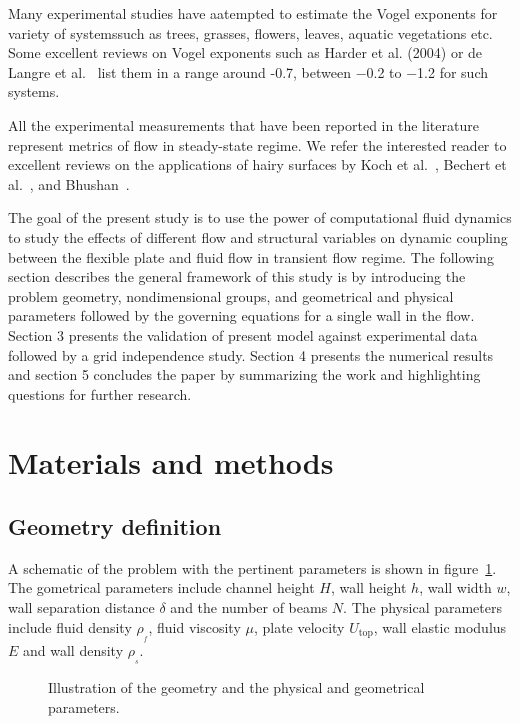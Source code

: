 \documentclass[preprint, letterpaper, nobibnotes, aps, superscriptaddress,prb]{revtex4-1}
\begin{document}
Many experimental studies have aatempted to estimate the Vogel exponents for variety of systemssuch as trees, grasses, flowers, leaves, aquatic vegetations etc. Some excellent reviews on Vogel exponents such as Harder et al. (2004) or de Langre et al.~\cite{DeLangre12} list them in a range around -0.7, between −0.2 to −1.2 for such systems. 

All the experimental measurements that have been reported in the literature represent metrics of flow in steady-state regime. 
We refer the interested reader to excellent reviews on the applications of hairy surfaces by Koch et al.~\cite{Koch09}, Bechert et al.~\cite{Bechert00}, and Bhushan~\cite{Bhushan12}.

The goal of the present study is to use the power of computational fluid dynamics to study the effects of different flow and structural variables on dynamic coupling between the flexible plate and fluid flow in transient flow regime. The following section describes the general framework of this study is by introducing the problem geometry, nondimensional groups, and geometrical and physical parameters followed by the governing equations for a single wall in the flow. Section 3 presents the validation of present model against experimental data followed by a grid independence study. Section 4 presents the numerical results and section 5 concludes the paper by summarizing the work and highlighting questions for further research.


\section{Materials and methods}

\subsection{Geometry definition}

A schematic of the problem with the pertinent parameters is shown in figure~\ref{fig:schematic}. The gometrical parameters include channel height $H$, wall height $h$, wall width $w$, wall separation distance $\delta$ and the number of beams $N$. The physical parameters include fluid density $\rho_{_f}$, fluid viscosity $\mu$, plate velocity $U_{\mathrm{top}}$, wall elastic modulus $E$ and wall density $\rho_{_s}$.

\begin{figure}[h]
\centering {}
\caption{Illustration of the geometry and the physical and geometrical parameters.}\protect\label{fig:schematic} 
\end{figure}
\end{document}

